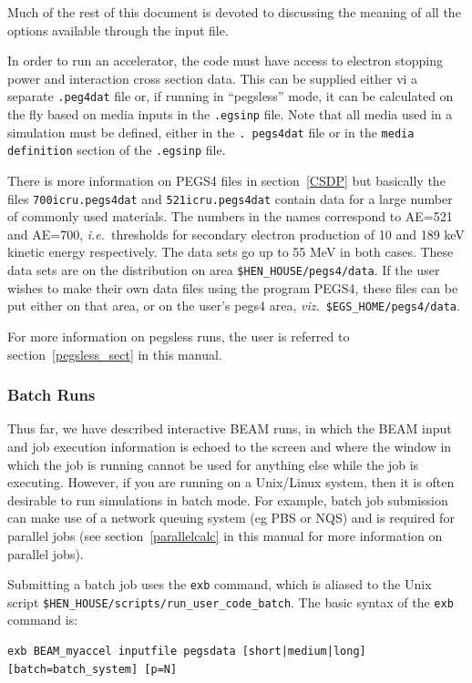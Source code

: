 \documentclass[12pt,twoside]{article}
\newcommand{\ie}{{\em i.e.}}
\newcommand{\viz}{{\em viz.}}
\begin{document}
Much of the rest of this document is devoted to discussing the meaning
of all the options available through the input file.

In order to run an accelerator, the code must have access to electron stopping
power and interaction cross section data.  This can be supplied either vi a
separate {\tt .peg4dat} file or, if running in ``pegsless'' mode, it can be
calculated on the fly based on media inputs in the {\tt .egsinp} file. Note that
all media used in a simulation must be defined, either in the {\tt. pegs4dat}
file or in the {\tt media definition} section of the {\tt .egsinp} file.

There is more information on PEGS4 files in section~\ref{CSDP}
but basically
the files \verb+700icru.pegs4dat+ and \verb+521icru.pegs4dat+
contain data for a large number of
commonly used materials. The numbers in the names correspond to AE=521
and AE=700, \ie\ thresholds for secondary electron production of 10 and
189 keV kinetic energy respectively. The data sets go up to 55 MeV in
both cases.  These data sets are on the distribution on area
\verb+$HEN_HOUSE/pegs4/data+.  If the user wishes to make their own data
files using the program PEGS4,
these files can be put either on that area, or on the user's pegs4
area, \viz\ \verb+$EGS_HOME/pegs4/data+.

For more information on pegsless runs, the user is referred to
section~\ref{pegsless_sect} in this manual.

\subsubsection{Batch Runs}
\label{batchsect}

Thus far, we have described interactive BEAM runs, in which the BEAM
input and job execution information is echoed to the screen and where
the window in which the job is running cannot be used for anything else
while the job is executing.  However, if you are running on a Unix/Linux
system, then it is often desirable to run simulations in batch mode.
For example, batch
job submission can make use of a network queuing system
(eg PBS or NQS) and is required for parallel jobs
(see section~\ref{parallelcalc} in this manual for more information
on parallel jobs).

Submitting a batch job uses the {\tt exb} command, which is aliased
to the Unix script {\tt \$HEN\_HOUSE/scripts/run\_user\_code\_batch}.  The
basic syntax of the {\tt exb} command is:
\begin{verbatim}
exb BEAM_myaccel inputfile pegsdata [short|medium|long] [batch=batch_system] [p=N]
\end{verbatim}
\end{document}
